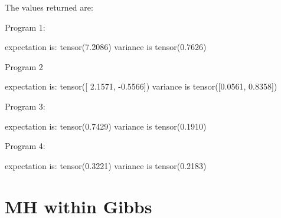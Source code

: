 \documentclass[12pt]{article}%
\theoremstyle{definition}
\begin{document}
	The values returned are:
	
	Program 1:
	
	expectation is: tensor(7.2086)
	variance is tensor(0.7626) 
	 
	
	Program 2
	 
	expectation is: tensor([ 2.1571, -0.5566])
	variance is tensor([0.0561, 0.8358]) 
	 
	
	Program 3:
	 
	expectation is: tensor(0.7429)
	variance is tensor(0.1910) 
	 
	
	Program 4: 
	 
	expectation is: tensor(0.3221)
	variance is tensor(0.2183) 
	
	
	\section{MH within Gibbs}
	
	
	
\end{document}
